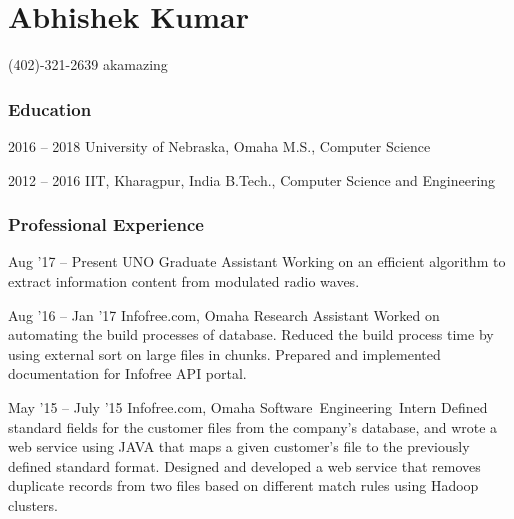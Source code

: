 \documentclass{tccv}
\begin{document}
\part{\textbf{Abhishek} Kumar}



    {(402)-321-2639}
    {akamazing}


\section{Education}

\begin{yearlist}

\item{2016 -- 2018}
     {University of Nebraska, Omaha}
     {M.S., Computer Science}

\item{2012 -- 2016}
     {IIT, Kharagpur, India}
     {B.Tech., Computer Science and Engineering}


\end{yearlist}

\section{Professional Experience}

\begin{experiencelist}

\item{Aug '17 -- Present}
     {UNO{}}
     {Graduate Assistant}
     {Working on an efficient algorithm to extract information content from modulated radio waves.}

\item{Aug '16 -- Jan '17}
     {Infofree.com{}, Omaha}
     {Research Assistant}
     {Worked on automating the build processes of database. Reduced the build process time by using external sort on large files in chunks. Prepared and implemented documentation for Infofree API portal.}

\item{May '15 -- July ’15}
     {Infofree.com{}, Omaha}
     {\mbox{Software Engineering Intern}}
     {Defined standard fields for the customer files from the company's database, and wrote a web service using JAVA that maps a given customer's file to the previously defined standard format. Designed and developed a web service that removes duplicate records from two files based on different match rules using Hadoop clusters.}

\end{experiencelist}
\end{document}
